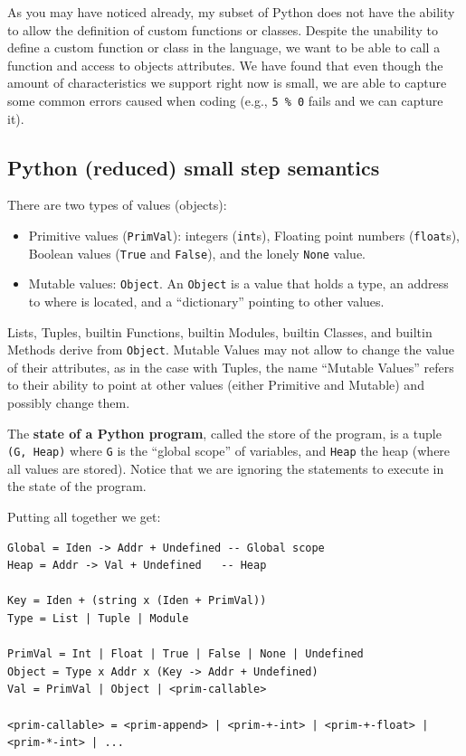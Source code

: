 \documentclass[
11pt, %
english, %
singlespacing, %
headsepline, %
]{MastersDoctoralThesis} %
\providecommand{\tightlist}{%
  \setlength{\itemsep}{0pt}\setlength{\parskip}{0pt}}
\newcommand{\inlinetodo}[1]{\todo[inline,size=\normalsize]{#1}}
\begin{document}
{\inlinetodo{damn, this needs a rewrite :S}}

As you may have noticed already, my subset of Python does not have the
ability to allow the definition of custom functions or classes. Despite
the unability to define a custom function or class in the language, we
want to be able to call a function and access to objects attributes. We
have found that even though the amount of characteristics we support
right now is small, we are able to capture some common errors caused
when coding (e.g., \texttt{5\ \%\ 0} fails and we can capture it).

\hypertarget{python-reduced-small-step-semantics}{%
\subsection{Python (reduced) small step
semantics}\label{python-reduced-small-step-semantics}}

There are two types of values (objects):

\begin{itemize}
\tightlist
\item
  Primitive values (\texttt{PrimVal}): integers (\texttt{int}s),
  Floating point numbers (\texttt{float}s), Boolean values
  (\texttt{True} and \texttt{False}), and the lonely \texttt{None}
  value.
\item
  Mutable values: \texttt{Object}. An \texttt{Object} is a value that
  holds a type, an address to where is located, and a
  \enquote{dictionary} pointing to other values.
\end{itemize}

Lists, Tuples, builtin Functions, builtin Modules, builtin Classes, and
builtin Methods derive from \texttt{Object}. Mutable Values may not
allow to change the value of their attributes, as in the case with
Tuples, the name \enquote{Mutable Values} refers to their ability to
point at other values (either Primitive and Mutable) and possibly change
them.

The \textbf{state of a Python program}, called the store of the program,
is a tuple \texttt{(G,\ Heap)} where \texttt{G} is the \enquote{global
scope} of variables, and \texttt{Heap} the heap (where all values are
stored). Notice that we are ignoring the statements to execute in the
state of the program.

Putting all together we get:

\begin{verbatim}
Global = Iden -> Addr + Undefined -- Global scope
Heap = Addr -> Val + Undefined   -- Heap

Key = Iden + (string x (Iden + PrimVal))
Type = List | Tuple | Module

PrimVal = Int | Float | True | False | None | Undefined
Object = Type x Addr x (Key -> Addr + Undefined)
Val = PrimVal | Object | <prim-callable>

<prim-callable> = <prim-append> | <prim-+-int> | <prim-+-float> | <prim-*-int> | ...
\end{verbatim}
\end{document}
